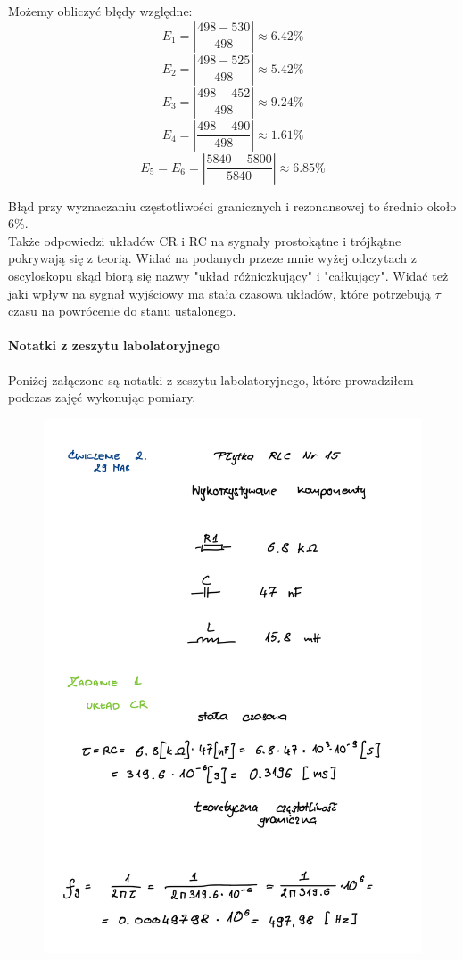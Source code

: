 \documentclass[14pt, table]{extarticle}
\begin{document}
Możemy obliczyć błędy względne:
$$ E_1 = \left| \frac{498 - 530}{498} \right| \approx 6.42\% $$
$$ E_2 = \left| \frac{498 - 525}{498} \right| \approx 5.42\% $$
$$ E_3 = \left| \frac{498 - 452}{498} \right| \approx 9.24\% $$
$$ E_4 = \left| \frac{498 - 490}{498} \right| \approx 1.61\% $$
$$ E_5 = E_6 = \left| \frac{5840 - 5800}{5840} \right| \approx 6.85\% $$

Błąd przy wyznaczaniu częstotliwości granicznych i rezonansowej to średnio około $6 \%$. \\

Także odpowiedzi układów CR i RC na sygnały prostokątne i trójkątne pokrywają się z teorią. Widać na podanych przeze mnie wyżej odczytach z oscyloskopu skąd biorą się nazwy "układ różniczkujący" i "całkujący". Widać też jaki wpływ na sygnał wyjściowy ma stała czasowa układów, które potrzebują $\tau$ czasu na powrócenie do stanu ustalonego.

\newpage
\paragraph{Notatki z zeszytu labolatoryjnego \\}
Poniżej załączone są notatki z zeszytu labolatoryjnego, które prowadziłem podczas zajęć wykonując pomiary.

\begin{figure}[H]
\includegraphics[scale=0.2]{B0}
\centering
\captionsetup{labelformat=empty}
\caption{}
\end{figure}
\end{document}
